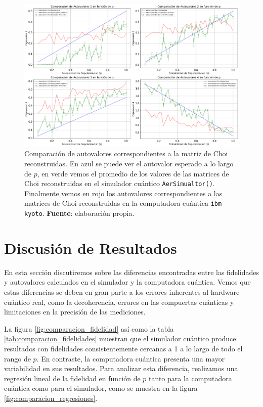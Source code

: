 \documentclass[letterpaper,12pt]{thesisECFM}
\theoremstyle{plain}
\theoremstyle{definition}
\theoremstyle{remark}
\newcommand{\1}{\mathbb{1}}
\begin{document}
\begin{figure}[h!] 
    \centering 
    \includegraphics[width=0.90 \linewidth]{imagenes/eigenvalores_comparacion.png}
    \caption{Comparación de autovalores correspondientes a la matriz de Choi reconstruidas. En azul se puede ver el autovalor esperado a lo largo de $p$, en verde vemos el promedio de los valores de las matrices de Choi reconstruidas  en el simulador cuántico \texttt{AerSimualtor()}. Finalmente vemos en rojo los autovalores correspondientes a las matrices de Choi reconstruidas en la computadora cuántica \texttt{ibm-kyoto}. \textbf{Fuente}: elaboración propia. }
    \label{fig:comparacion_autovalores}
\end{figure}
\section{Discusión de Resultados} %
En esta sección discutiremos sobre las diferencias encontradas entre las
fidelidades y autovalores calculados en el simulador y la computadora cuántica.
Vemos que estas diferencias se deben en gran parte a los errores inherentes al
hardware cuántico real, como la decoherencia, errores en las compuertas
cuánticas y limitaciones en la precisión de las mediciones. 

La figura \ref{fig:comparacion_fidelidad} así como la tabla
\ref{tab:comparacion_fidelidades} muestran que el simulador cuántico produce
resultados con fidelidades consistentemente cercanas a 1 a lo largo de todo el
rango de $p$. En contraste, la computadora cuántica presenta una mayor
variabilidad en sus resultados. Para analizar esta diferencia, realizamos una
regresión lineal de la fidelidad en función de $p$ tanto para la computadora
cuántica como para el simulador, como se muestra en la figura
\ref{fig:comparacion_regresiones}.
\end{document}

